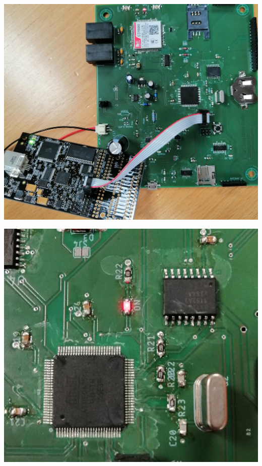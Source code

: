 {\begin{minipage}[b][8cm][t]{0.49\textwidth}
\centering
\includegraphics[width=0.9\linewidth]{graphics/HW_Val/MCU_flashen.jpg}
\label{fig:MCU_flashen}
\end{minipage}}
{\begin{minipage}[b][8cm][t]{0.49\textwidth}
\centering
\includegraphics[width=0.9\linewidth]{graphics/HW_Val/MCU_LED.jpg}
\label{fig:MCU_LED}
\end{minipage}}

